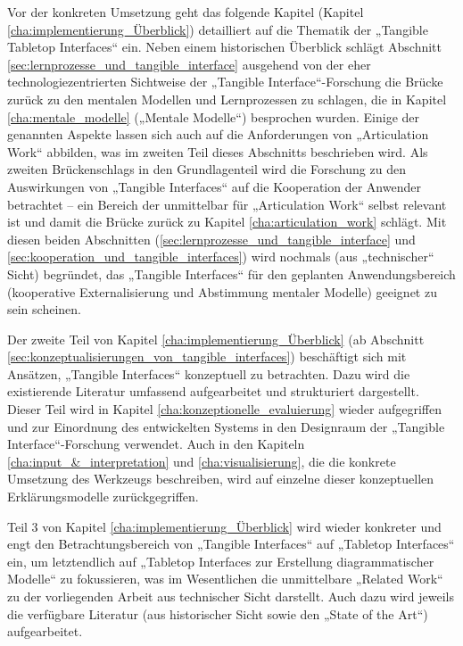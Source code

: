 Vor der konkreten Umsetzung geht das folgende Kapitel (Kapitel \ref{cha:implementierung_Überblick}) detailliert auf die Thematik der „Tangible Tabletop Interfaces“ ein. Neben einem historischen Überblick schlägt Abschnitt \ref{sec:lernprozesse_und_tangible_interface} ausgehend von der eher technologiezentrierten Sichtweise der „Tangible Interface“-Forschung die Brücke zurück zu den mentalen Modellen und Lernprozessen zu schlagen, die in Kapitel \ref{cha:mentale_modelle} („Mentale Modelle“) besprochen wurden. Einige der genannten Aspekte lassen sich auch auf die Anforderungen von „Articulation Work“ abbilden, was im zweiten Teil dieses Abschnitts beschrieben wird. Als zweiten Brückenschlags in den Grundlagenteil wird die Forschung zu den Auswirkungen von „Tangible Interfaces“ auf die Kooperation der Anwender betrachtet -- ein Bereich der unmittelbar für „Articulation Work“ selbst relevant ist und damit die Brücke zurück zu Kapitel \ref{cha:articulation_work} schlägt. Mit diesen beiden Abschnitten (\ref{sec:lernprozesse_und_tangible_interface} und \ref{sec:kooperation_und_tangible_interfaces}) wird nochmals (aus „technischer“ Sicht) begründet, das „Tangible Interfaces“ für den geplanten Anwendungsbereich (kooperative Externalisierung und Abstimmung mentaler Modelle) geeignet zu sein scheinen.

Der zweite Teil von Kapitel \ref{cha:implementierung_Überblick} (ab Abschnitt \ref{sec:konzeptualisierungen_von_tangible_interfaces}) beschäftigt sich mit Ansätzen, „Tangible Interfaces“ konzeptuell zu betrachten. Dazu wird die existierende Literatur umfassend aufgearbeitet und strukturiert dargestellt. Dieser Teil wird in Kapitel \ref{cha:konzeptionelle_evaluierung} wieder aufgegriffen und zur Einordnung des entwickelten Systems in den Designraum der „Tangible Interface“-Forschung verwendet. Auch in den Kapiteln \ref{cha:input_&_interpretation} und \ref{cha:visualisierung}, die die konkrete Umsetzung des Werkzeugs beschreiben, wird auf einzelne dieser konzeptuellen Erklärungsmodelle zurückgegriffen.

Teil 3 von Kapitel \ref{cha:implementierung_Überblick} wird wieder konkreter und engt den Betrachtungsbereich von „Tangible Interfaces“ auf „Tabletop Interfaces“ ein, um letztendlich auf „Tabletop Interfaces zur Erstellung diagrammatischer Modelle“ zu fokussieren, was im Wesentlichen die unmittelbare „Related Work“ zu der vorliegenden Arbeit aus technischer Sicht darstellt. Auch dazu wird jeweils die verfügbare Literatur (aus historischer Sicht sowie den „State of the Art“) aufgearbeitet.


